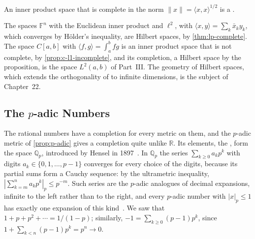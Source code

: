 \begin{definition}
\label{def:hilbert-space}
An inner product space that is complete in the norm $\|x\|=\langle x,x\rangle^{1/2}$ is a .
\end{definition}

The spaces $\mathbb F^n$ with the Euclidean inner product and $\ell^2$, with $\langle x,y\rangle=\sum_k\bar x_ky_k$, which converges by H\"older's inequality, are Hilbert spaces, by \cref{thm:lp-complete}. The space $C[a,b]$ with $\langle f,g\rangle=\int_a^bfg$ is an inner product space that is not complete, by \cref{prop:c-l1-incomplete}, and its completion, a Hilbert space by the proposition, is the space $L^2(a,b)$ of Part~III. The geometry of Hilbert spaces, which extends the orthogonality of  to infinite dimensions, is the subject of Chapter~22.

\subsection{The \texorpdfstring{$p$}{p}-adic Numbers}

The rational numbers have a completion for every metric on them, and the $p$-adic metric of \cref{prop:p-adic} gives a completion quite unlike $\mathbb R$. Its elements, the , form the space $\mathbb Q_p$, introduced by Hensel in 1897~\cite{hensel1897}. In $\mathbb Q_p$ the series $\sum_{k\ge0}a_kp^k$ with digits $a_k\in\{0,1,\ldots,p-1\}$ converges for every choice of the digits, because its partial sums form a Cauchy sequence: by the ultrametric inequality, $|\sum_{k=m}^na_kp^k|_p\le p^{-m}$. Such series are the $p$-adic analogues of decimal expansions, infinite to the left rather than to the right, and every $p$-adic number with $|x|_p\le1$ has exactly one expansion of this kind~\cite{gouvea1997}. We saw that $1+p+p^2+\cdots=1/(1-p)$; similarly, $-1=\sum_{k\ge0}(p-1)p^k$, since $1+\sum_{k<n}(p-1)p^k=p^n\to0$.

